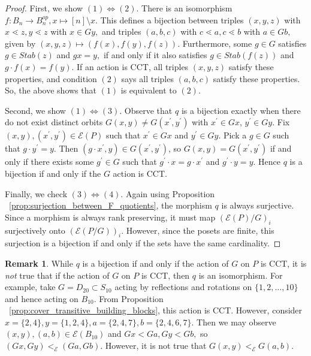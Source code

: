 \documentclass[10 pt]{amsart}
\theoremstyle{plain}
\theoremstyle{definition}
\newtheorem{rem}[thm]{Remark}
\theoremstyle{remark}
\numberwithin{equation}{section}
\renewcommand{\iff}{\Leftrightarrow}
\begin{document}
\begin{proof}
First, we show $(1) \iff (2).$ There is an isomorphism $f:B_n \rightarrow B_n^{op},x \mapsto [n]\setminus x.$ This defines a bijection between triples $(x,y,z)$ with $x \lessdot z,y \lessdot z$ with $x \in Gy,$ and triples $(a,b,c)$ with $c \lessdot a, c \lessdot b$ with $a \in Gb,$ given by $(x,y,z)\mapsto (f(x),f(y),f(z)).$ Furthermore, some $g \in G$ satisfies $g \in Stab(z)$ and $gx = y,$ if and only if it also satisfies $g \in Stab(f(z))$ and $g\cdot f(x) = f(y).$ If an action is CCT, all triples $(x,y,z)$ satisfy these properties, and condition $(2)$ says all triples $(a,b,c)$ satisfy these properties. So, the above shows that $(1)$ is equivalent to $(2).$

Second, we show $(1) \iff (3)$. Observe that $q$ is a bijection exactly when there do not exist distinct orbits $G(x, y) \ne G(x^\prime, y^\prime)$ with $x^\prime\in Gx$, $y^\prime\in Gy$.  Fix $(x, y), (x^\prime, y^\prime)\in \mathcal E(P)$ such that $x^\prime\in Gx$ and $y^\prime\in Gy$.  Pick a $g\in G$ such that $g\cdot y^\prime = y$.  Then $(g\cdot x^\prime, y)\in G(x^\prime, y^\prime)$, so $G(x, y) = G(x^\prime, y^\prime)$ if and only if there exists some $g^\prime\in G$ such that $g^\prime\cdot x = g\cdot x^\prime$ and $g^\prime\cdot y = y$. Hence $q$ is a bijection if and only if the $G$ action is CCT.


Finally, we check $(3)\iff (4).$ Again using Proposition ~\ref{prop:surjection_between_F_quotients}, the morphism $q$ is always surjective. Since a morphism is always rank preserving, it must map $(\mathcal E(P)/G)_i$ surjectively onto $(\mathcal E(P/G))_i.$ However, since the posets are finite, this surjection is a bijection if and only if the sets have the same cardinality.
\end{proof}

\begin{rem}
While $q$ is a bijection if and only if the action of $G$ on $P$ is CCT, it is {\it not} true that if the action of $G$ on $P$ is CCT, then $q$ is an isomorphism.  For example, take $G=D_{20} \subset S_{10}$ acting by reflections and rotations on $\{1,2,\ldots,10\}$ and hence acting on $B_{10}.$ From Proposition ~\ref{prop:cover_transitive_building_blocks}, this action is CCT. However, consider $x = \{2,4\},y = \{1,2,4\},a = \{2,4,7\},b = \{2,4,6,7\}.$ Then we may observe $(x , y),(a, b) \in \mathcal E(B_{10})$ and $Gx < Ga, Gy < Gb,$ so $(Gx, Gy) <_{\mathcal E} (Ga, Gb).$ However, it is not true that $G(x, y)<_{\mathcal E} G(a,b)$.
\end{rem}
\end{document}
